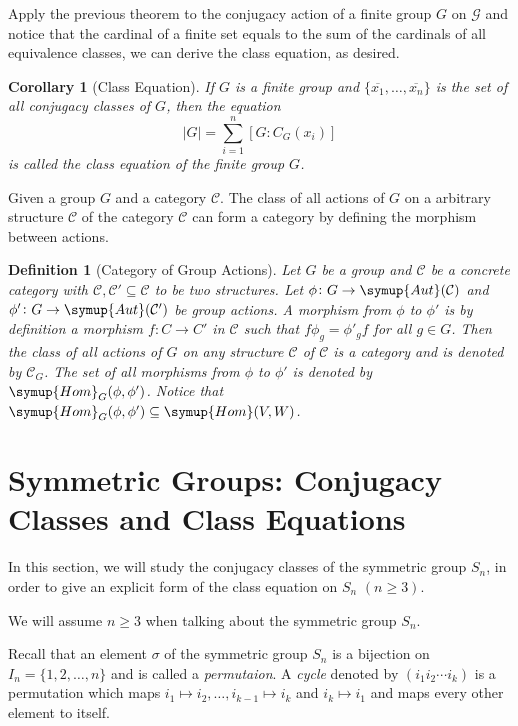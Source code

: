 \documentclass{assignment}[2019/10/15]
\theoremstyle{plain}
\newtheorem{definition}[theorem]{Definition}
\newtheorem{corollary}[theorem]{Corollary}
\newcommand{\Hom}{\mathop{}\!\symup{Hom}}
\newcommand{\Aut}{\mathop{}\!\symup{Aut}}
\begin{document}
    Apply the previous theorem to the conjugacy action of a finite group $G$ on $\mathcal{G}$ and notice that the cardinal of a finite set equals to the sum of the cardinals of all equivalence classes, we can derive the class equation, as desired.

    \begin{corollary}[Class Equation]
        If $G$ is a finite group and $\{\overline{x_1}, \dotsc, \overline{x_n}\}$ is the set of all conjugacy classes of $G$, then the equation
        \begin{equation}
            |G| = \sum_{i=1}^n[G: C_G(x_i)]
        \end{equation}
        is called the \emph{class equation} of the finite group $G$.
    \end{corollary}

    Given a group $G$ and a category $\mathscr{C}$. The class of all actions of $G$ on a arbitrary structure $\mathcal{C}$ of the category $\mathscr{C}$ can form a category by defining the morphism between actions.

    \begin{definition}[Category of Group Actions]
        Let $G$ be a group and $\mathscr{C}$ be a concrete category with $\mathcal{C}, \mathcal{C}'\subseteq \mathscr{C}$ to be two structures. Let $\phi\colon G\to \Aut(\mathcal{C})$ and $\phi'\colon G\to\Aut(\mathcal{C}')$ be group actions. A morphism from $\phi$ to $\phi'$ is by definition a morphism $f\colon C\to C'$ in $\mathscr{C}$ such that $f\phi_g = \phi'_gf$ for all $g\in G$. Then the class of all actions of $G$ on any structure $\mathcal{C}$ of $\mathscr{C}$ is a category and is denoted by $\mathscr{C}_G$. The set of all morphisms from $\phi$ to $\phi'$ is denoted by $\Hom_G(\phi, \phi')$. Notice that $\Hom_{G}(\phi, \phi')\subseteq \Hom(V, W)$.
    \end{definition}

    \section{Symmetric Groups: Conjugacy Classes and Class Equations}

    In this section, we will study the conjugacy classes of the symmetric group $S_n$, in order to give an explicit form of the class equation on $S_n$ $(n\geq 3)$.

    We will assume $n\geq 3$ when talking about the symmetric group $S_n$.

    Recall that an element $\sigma$ of the symmetric group $S_n$ is a bijection on $I_n = \{1, 2, \dotsc, n\}$ and is called a \emph{permutaion}.
    A \emph{cycle} denoted by $(i_1 i_2 \dotsb i_k)$ is a permutation which maps $i_1\mapsto i_2, \dotsc, i_{k-1}\mapsto i_k$ and $i_k\mapsto i_1$ and maps every other element to itself.
\end{document}
